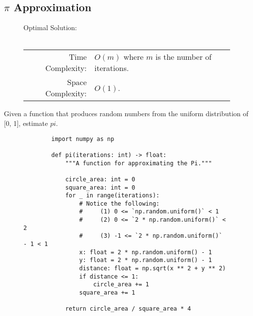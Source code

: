 
\subsection{\(\pi\) Approximation}

\begin{figure}[H]
    Optimal Solution:\\\\
    \begin{tabular}{rl}
        Time Complexity:& \(O(m)\) where \(m\) is the number of iterations.\\
        Space Complexity:& \(O(1)\).
    \end{tabular}
\end{figure}

Given a function that produces random numbers from the uniform distribution of
[0, 1], estimate \(pi\).

\begin{figure}[H]
    \centering
    \begin{verbatim}
        import numpy as np

        def pi(iterations: int) -> float:
            """A function for approximating the Pi."""

            circle_area: int = 0
            square_area: int = 0
            for _ in range(iterations):
                # Notice the following:
                #     (1) 0 <= `np.random.uniform()` < 1
                #     (2) 0 <= `2 * np.random.uniform()` < 2
                #     (3) -1 <= `2 * np.random.uniform()`  - 1 < 1
                x: float = 2 * np.random.uniform() - 1
                y: float = 2 * np.random.uniform() - 1
                distance: float = np.sqrt(x ** 2 + y ** 2)
                if distance <= 1:
                    circle_area += 1
                square_area += 1

            return circle_area / square_area * 4
    \end{verbatim}
\end{figure}
